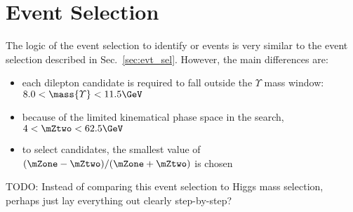 \section{Event Selection}
\label{sec:evt_sel_dilep}
The logic of the event selection to identify \htozzd or \htozdzd events is very similar to the event selection described in Sec.~\ref{sec:evt_sel}.
However, the main differences are:
\begin{itemize}
    \item each dilepton candidate is required to fall outside the $\varUpsilon$ mass window: $8.0 < \mass{\varUpsilon} < 11.5\GeV$
    \item because of the limited kinematical phase space in the \zdzd search, $4 < \mZtwo < 62.5\GeV$
    \item to select \zdzd candidates, the smallest value of $(\mZone - \mZtwo)/(\mZone + \mZtwo)$ is chosen
\end{itemize}

TODO: Instead of comparing this event selection to Higgs mass selection, perhaps just lay everything out clearly step-by-step?
